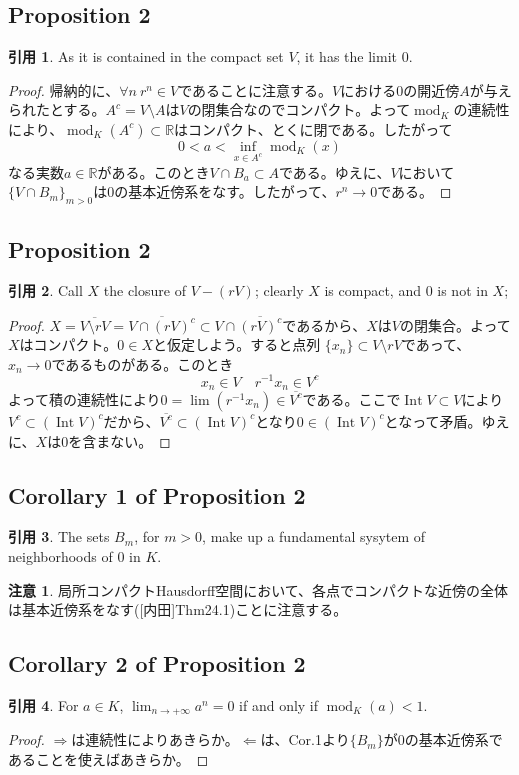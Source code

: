 \documentclass[12pt]{jsarticle}%
\renewenvironment{leftbar}{%
  \renewcommand\FrameCommand{\vrule width 1pt \hspace{10pt}}%
  \MakeFramed {\advance\hsize-\width \FrameRestore}}%
 {\endMakeFramed}
\newcommand{\barquo}[1]{\begin{leftbar} \begin{quo} #1 \end{quo} \end{leftbar}}%
\newcommand{\bfsubsection}[1]{\subsection*{\textbf{#1}}}
\theoremstyle{definition}%
\newtheorem*{rem}{注意}
\newtheorem*{quo}{引用}
\DeclareMathOperator{\module}{mod}%
\DeclareMathOperator{\Int}{Int}
\newcommand{\bbr}{{\mathbb R}}
\newcommand{\R}{\bbr}
\begin{document}
\bfsubsection{Proposition 2}
\barquo{
As it is contained in the compact set $V$, it has the limit $0$.
}
\begin{proof}
  帰納的に、$\forall n \ r^n \in V$であることに注意する。$V$における0の開近傍$A$が与えられたとする。$A^c = V \setminus A$は$V$の閉集合なのでコンパクト。よって$\module_K$の連続性により、$\module_K(A^c) \subset \R$はコンパクト、とくに閉である。したがって
  \[
  0 < a < \inf_{x \in A^c}\module_K(x)
  \]
  なる実数$a \in \R$がある。このとき$V \cap B_a \subset A$である。ゆえに、$V$において$\{V \cap B_m \}_{m > 0}$は0の基本近傍系をなす。したがって、$r^n \rightarrow 0$である。
\end{proof}



\bfsubsection{Proposition 2}
\barquo{
Call $X$ the closure of $V - (rV)$; clearly $X$ is compact, and $0$ is not in $X$;
}
\begin{proof}
  $X = \overline{V \setminus rV} = \overline{V \cap (rV)^c} \subset V \cap \overline{(rV)^c}$であるから、$X$は$V$の閉集合。よって$X$はコンパクト。$0 \in X$と仮定しよう。すると点列 $\{ x_{n}\} \subset V \setminus rV$であって、$x_{n} \rightarrow 0$であるものがある。このとき
  \[
  x_{n} \in V \quad r^{-1}x_{n} \in V^c
  \]
  よって積の連続性により$0 = \lim(r^{-1}x_{n}) \in \overline{V^c}$である。ここで$\Int V \subset V$により$V^c \subset (\Int V)^c$だから、$\overline{V^c} \subset (\Int V)^c$となり$0 \in (\Int V)^c$となって矛盾。ゆえに、$X$は0を含まない。
\end{proof}




\bfsubsection{Corollary 1 of Proposition 2}
\barquo{The sets $B_m$, for $m > 0$, make up a fundamental sysytem of neighborhoods of $0$ in $K$.
}

\begin{rem}
局所コンパクトHausdorff空間において、各点でコンパクトな近傍の全体は基本近傍系をなす([内田]\cite{内田}Thm24.1)ことに注意する。
\end{rem}

\bfsubsection{Corollary 2 of Proposition 2}
\barquo{For $a \in K$, $\lim_{n \to +\infty} a^n =0$ if and only if $\module_K(a) < 1$.
}

\begin{proof}
$\Rightarrow$は連続性によりあきらか。$\Leftarrow$は、Cor.1より$\{B_m\}$が0の基本近傍系であることを使えばあきらか。
\end{proof}
\end{document}
